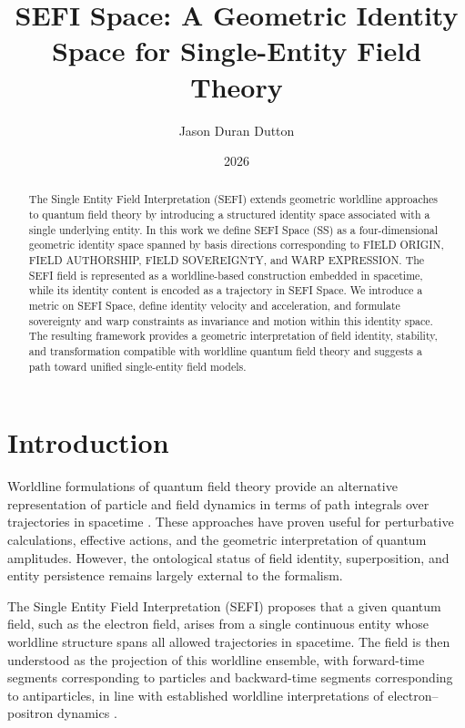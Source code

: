 \documentclass[12pt]{article}
\title{SEFI Space: A Geometric Identity Space for Single-Entity Field Theory}
\author{Jason Duran Dutton}
\date{2026}
\begin{document}
\maketitle

\begin{abstract}
The Single Entity Field Interpretation (SEFI) extends geometric worldline approaches to quantum field theory
by introducing a structured identity space associated with a single underlying entity. In this work we define
SEFI Space (SS) as a four-dimensional geometric identity space spanned by basis directions corresponding to
FIELD ORIGIN, FIELD AUTHORSHIP, FIELD SOVEREIGNTY, and WARP EXPRESSION. The SEFI field is represented as
a worldline-based construction embedded in spacetime, while its identity content is encoded as a trajectory
in SEFI Space. We introduce a metric on SEFI Space, define identity velocity and acceleration, and formulate
sovereignty and warp constraints as invariance and motion within this identity space. The resulting framework
provides a geometric interpretation of field identity, stability, and transformation compatible with worldline
quantum field theory and suggests a path toward unified single-entity field models.
\end{abstract}

\section{Introduction}

Worldline formulations of quantum field theory provide an alternative representation of particle and field
dynamics in terms of path integrals over trajectories in spacetime \cite{Polyakov1987,Schubert2001,Strassler1992}.
These approaches have proven useful for perturbative calculations, effective actions, and the geometric
interpretation of quantum amplitudes. However, the ontological status of field identity, superposition, and
entity persistence remains largely external to the formalism.

The Single Entity Field Interpretation (SEFI) proposes that a given quantum field, such as the electron field,
arises from a single continuous entity whose worldline structure spans all allowed trajectories in spacetime.
The field is then understood as the projection of this worldline ensemble, with forward-time segments
corresponding to particles and backward-time segments corresponding to antiparticles, in line with established
worldline interpretations of electron--positron dynamics \cite{Schubert2001,Strassler1992}.
\end{document}
